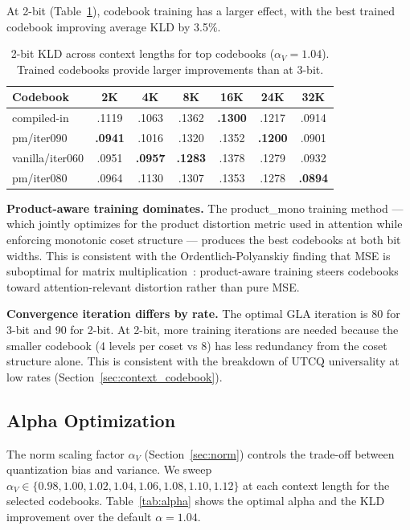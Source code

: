 \documentclass{article}
\begin{document}
At 2-bit (Table~\ref{tab:codebook_2bit}), codebook training has a larger
effect, with the best trained codebook improving average KLD by 3.5\%.

\begin{table}[t]
\centering
\caption{2-bit KLD across context lengths for top codebooks ($\alpha_V = 1.04$).
Trained codebooks provide larger improvements than at 3-bit.}
\label{tab:codebook_2bit}
\begin{tabular}{@{}lcccccc@{}}
\toprule
Codebook & 2K & 4K & 8K & 16K & 24K & 32K \\
\midrule
compiled-in          & .1119 & .1063 & .1362 & \textbf{.1300} & .1217 & .0914 \\
pm/iter090           & \textbf{.0941} & .1016 & .1320 & .1352 & \textbf{.1200} & .0901 \\
vanilla/iter060      & .0951 & \textbf{.0957} & \textbf{.1283} & .1378 & .1279 & .0932 \\
pm/iter080           & .0964 & .1130 & .1307 & .1353 & .1278 & \textbf{.0894} \\
\bottomrule
\end{tabular}
\end{table}

\textbf{Product-aware training dominates.} The product\_mono training method
--- which jointly optimizes for the product distortion metric used in attention
while enforcing monotonic coset structure --- produces the best codebooks at
both bit widths. This is consistent with the Ordentlich-Polyanskiy finding that
MSE is suboptimal for matrix multiplication~\cite{ordentlich2024matmul}:
product-aware training steers codebooks toward attention-relevant distortion
rather than pure MSE.

\textbf{Convergence iteration differs by rate.} The optimal GLA iteration
is 80 for 3-bit and 90 for 2-bit. At 2-bit, more training iterations are
needed because the smaller codebook (4 levels per coset vs 8) has less
redundancy from the coset structure alone. This is consistent with the
breakdown of UTCQ universality at low rates
(Section~\ref{sec:context_codebook}).

\subsection{Alpha Optimization}
\label{sec:alpha_results}

The norm scaling factor $\alpha_V$ (Section~\ref{sec:norm}) controls the
trade-off between quantization bias and variance. We sweep $\alpha_V \in
\{0.98, 1.00, 1.02, 1.04, 1.06, 1.08, 1.10, 1.12\}$ at each context length
for the selected codebooks. Table~\ref{tab:alpha} shows the optimal alpha and
the KLD improvement over the default $\alpha = 1.04$.
\end{document}
